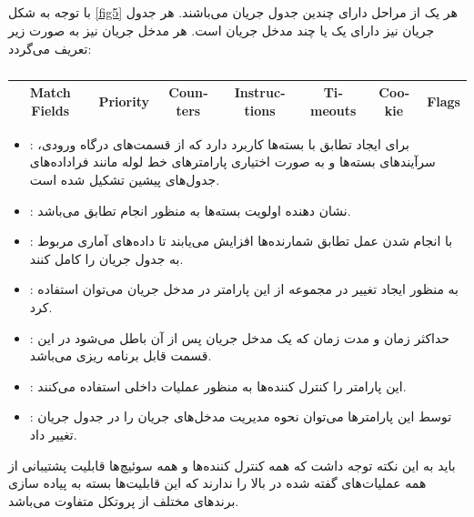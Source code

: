 \subsection{}
با توجه به شکل \ref{fig5} هر یک از مراحل  دارای چندین جدول جریان می‌باشند. هر جدول جریان نیز دارای یک یا چند مدخل جریان است. هر مدخل جریان نیز به صورت زیر تعریف می‌گردد:
\begin{table}[ht]
	\centering
	\begin{latin}
		\begin{tabular}[t]{|c|c|c|c|c|c|c|}
			\hline
			Match Fields & Priority & Counters & Instructions & Timeouts & Cookie & Flags\\
			\hline
		\end{tabular}
	\end{latin}
	\caption{ \cite{spec}}
	\label{tab1}
\end{table}

\begin{itemize}
	\item {}:
برای ایجاد تطابق با بسته‌ها کاربرد دارد که از قسمت‌های درگاه ورودی، سرآیند‌های بسته‌ها و به صورت اختیاری پارامتر‌های خط لوله مانند فراداده‌های جدول‌های پیشین تشکیل شده است.
	\item {}:
نشان دهنده اولویت بسته‌ها به منظور انجام تطابق می‌باشد.
	\item {}:
با انجام شدن عمل تطابق شمارنده‌ها افزایش می‌یابند تا داده‌های آماری مربوط به جدول جریان را کامل کنند.
	\item {}:
به منظور ایجاد تغییر در مجموعه  از این پارامتر در مدخل جریان می‌توان استفاده کرد.
	\item {}:
حداکثر زمان و مدت زمان  که یک مدخل جریان پس از آن باطل می‌شود در این قسمت قابل برنامه ریزی می‌باشد.
	\item {}:
این پارامتر را کنترل کننده‌ها به منظور عملیات داخلی استفاده می‌کنند.
	\item {}:
توسط این پارامتر‌ها می‌توان نحوه مدیریت مدخل‌های جریان را در جدول جریان تغییر داد.
\end{itemize}

باید به این نکته توجه داشت که همه کنترل کننده‌ها و همه سوئیچ‌ها قابلیت پشتیبانی از همه عملیات‌های گفته شده در بالا را ندارند که این قابلیت‌ها بسته به پیاده سازی برند‌های مختلف از پروتکل متفاوت می‌باشد.


